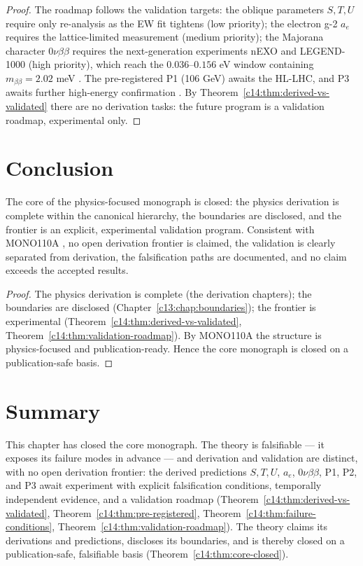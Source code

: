\begin{proof}
The roadmap follows the validation targets: the oblique parameters $S,T,U$ require only
re-analysis as the EW fit tightens (low priority); the electron g-2 $a_e$ requires the
lattice-limited measurement (medium priority); the Majorana character $0\nu\beta\beta$
requires the next-generation experiments nEXO and LEGEND-1000 (high priority), which reach
the $0.036$--$0.156$ eV window containing $m_{\beta\beta} = 2.02$ meV \cite{c14:VALID001}. The
pre-registered P1 (106 GeV) awaits the HL-LHC, and P3 awaits further high-energy
confirmation \cite{c14:QG199,c14:QG200}. By Theorem~\ref{c14:thm:derived-vs-validated} there are
no derivation tasks: the future program is a validation roadmap, experimental only.
\end{proof}

\section{Conclusion}
\label{c14:sec:frontier-conclusion}

\begin{theorem}
\label{c14:thm:core-closed}
The core of the physics-focused monograph is closed: the physics derivation is complete
within the canonical hierarchy, the boundaries are disclosed, and the frontier is an
explicit, experimental validation program. Consistent with MONO110A \cite{c14:MONO110A}, no
open derivation frontier is claimed, the validation is clearly separated from derivation,
the falsification paths are documented, and no claim exceeds the accepted results.
\end{theorem}

\begin{proof}
The physics derivation is complete (the derivation chapters); the boundaries are disclosed
(Chapter~\ref{c13:chap:boundaries}); the frontier is experimental
(Theorem~\ref{c14:thm:derived-vs-validated}, Theorem~\ref{c14:thm:validation-roadmap}). By
MONO110A \cite{c14:MONO110A} the structure is physics-focused and publication-ready. Hence the
core monograph is closed on a publication-safe basis.
\end{proof}

\section{Summary}
\label{c14:sec:frontier-summary}

This chapter has closed the core monograph. The theory is falsifiable --- it exposes its
failure modes in advance --- and derivation and validation are distinct, with no open
derivation frontier: the derived predictions $S,T,U$, $a_e$, $0\nu\beta\beta$, P1, P2, and P3
await experiment with explicit falsification conditions, temporally independent evidence,
and a validation roadmap (Theorem~\ref{c14:thm:derived-vs-validated},
Theorem~\ref{c14:thm:pre-registered}, Theorem~\ref{c14:thm:failure-conditions},
Theorem~\ref{c14:thm:validation-roadmap}). The theory claims its derivations and predictions,
discloses its boundaries, and is thereby closed on a publication-safe, falsifiable basis
(Theorem~\ref{c14:thm:core-closed}).

